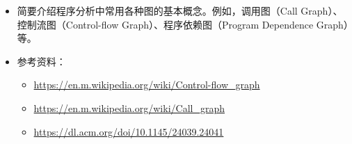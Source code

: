 \documentclass[a4paper, justified]{tufte-handout}
\begin{document}

\begin{ot}[程序中的图]
	\begin{itemize}
		\item 简要介绍程序分析中常用各种图的基本概念。例如，调用图（Call Graph）、控制流图（Control-flow Graph）、程序依赖图（Program Dependence Graph）等。

		\item 参考资料：
		      \begin{itemize}
			      \item \href{https://en.m.wikipedia.org/wiki/Control-flow_graph}{https://en.m.wikipedia.org/wiki/Control-flow\_graph}
			      \item \href{https://en.m.wikipedia.org/wiki/Call_graph}{https://en.m.wikipedia.org/wiki/Call\_graph}
			      \item \href{https://dl.acm.org/doi/10.1145/24039.24041}{https://dl.acm.org/doi/10.1145/24039.24041}
		      \end{itemize}
	\end{itemize}

\end{ot}



% 




\beginfb

% 
% 
\end{document}
